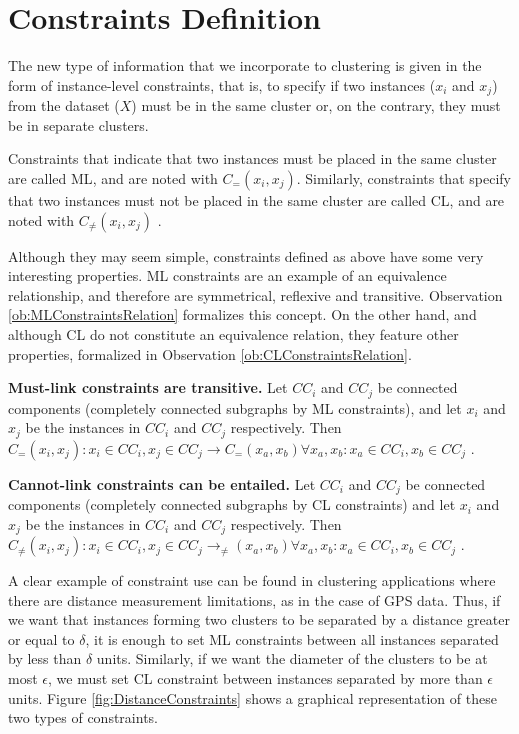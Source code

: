 \section{Constraints Definition}

The new type of information that we incorporate to clustering is given in the form of instance-level constraints, that is, to specify if two instances ($x_i$ and $x_j$) from the dataset ($X$) must be in the same cluster or, on the contrary, they must be in separate clusters.

Constraints that indicate that two instances must be placed in the same cluster are called \acf{ML}, and are noted with $C_=(x_i,x_j)$. Similarly, constraints that specify that two instances must not be placed in the same cluster are called \acf{CL}, and are noted with $C_{\neq}(x_i,x_j)$ \cite{wagstaff2000clustering}.

Although they may seem simple, constraints defined as above have some very interesting properties. \acs{ML} constraints are an example of an equivalence relationship, and therefore are symmetrical, reflexive and transitive. Observation \ref{ob:MLConstraintsRelation} formalizes this concept. On the other hand, and although \acs{CL} do not constitute an equivalence relation, they feature other properties, formalized in Observation \ref{ob:CLConstraintsRelation}.

\begin{observation}
	\textbf{Must-link constraints are transitive.} Let $CC_i$ and $CC_j$ be connected components (completely connected subgraphs by \acs{ML} constraints), and let $x_i$ and $x_j$ be the instances in $CC_i$ and $CC_j$ respectively. Then $C_=(x_i,x_j): x_i \in CC_i, x_j \in CC_j \rightarrow C_=(x_a,x_b) \forall x_a, x_b: x_a\in CC_i, x_b \in CC_j$ \cite{davidson2007survey}.
	\label{ob:MLConstraintsRelation}
\end{observation}

\begin{observation}
	\textbf{Cannot-link constraints can be entailed.} Let $CC_i$ and $CC_j$ be connected components (completely connected subgraphs by \acs{CL} constraints) and let $x_i$ and $x_j$ be the instances in $CC_i$ and $CC_j$ respectively. Then $C_{\neq}(x_i, x_j): x_i \in CC_i, x_j \in CC_j \rightarrow _{\neq}(x_a, x_b) \forall x_a, x_b: x_a\in CC_i, x_b \in CC_j$ \cite{davidson2007survey}
	\label{ob:CLConstraintsRelation}.
\end{observation}

A clear example of constraint use can be found in clustering applications where there are distance measurement limitations, as in the case of \acs{GPS} data. Thus, if we want that instances forming two clusters to be separated by a distance greater or equal to $\delta$, it is enough to set \acs{ML} constraints between all instances separated by less than $\delta$ units. Similarly, if we want the diameter of the clusters to be at most $\epsilon$, we must set \acs{CL} constraint between instances separated by more than $\epsilon$ units. Figure \ref{fig:DistanceConstraints} shows a graphical representation of these two types of constraints.

